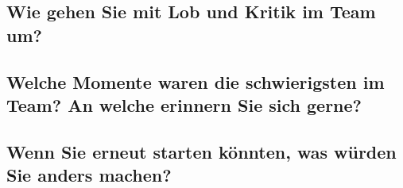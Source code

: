 \subsection*{Wie gehen Sie mit Lob und Kritik im Team um?}

\subsection*{Welche Momente waren die schwierigsten im Team? An welche erinnern Sie sich
gerne?}

\subsection*{Wenn Sie erneut starten könnten, was würden Sie anders machen?}

\begin{comment}
Nach unseren individuell erstellten Selbsteinsch"atzungen, folgen nun die Fremdeinsch"atzungen, welche f"ur
den Vergleich von Selbst- und Fremdbild unabdingbar sind.
Dazu hat jedes Teammitglied seine eigene Form der Bearbeitung gew"ahlt. Dies war einerseits der Selbsteinsch"atzungstest, andererseits wurden anhand von spezifisch beobachteten Situationen eine Teamrollenzuteilung
vorgenommen.
\subsection*{Pascal Horat}

Auch um meine Teamkameraden einzuschätzen habe ich mich des vorher beschriebenen Belbin-Tests bedient. Dies vor allem aus drei Gründen:
\begin{enumerate}
\item Durch die vorgegebene Form ergibt sich meiner Meinung nach eine neutralere Betrachtung der Teamitglieder, da meine Einschätzung nicht nur auf ein bis zwei spezifischen Vorfällen beruht.
\item Durch die vorgegebene Form mit den Aussagen werde ich durch das Verfahren geleitet und muss nicht selber etwas entwickeln.
\item Da für die Bestimmung der Selbst- sowie der Fremdeinschätzung derselbe Test verwendet wurde, können direkte Vergleiche zwischen den Teammitgliedern gemacht werden.
\end{enumerate}

Dies hat für Gerome folgende Resultate hervorgebracht:



Von meinen Teammitgliedern fiel es mir, ohne die Hilfe des Tests, schwieriger, Gerome eine passende Rolle zuzuteilen. Darum hätte ich eine ausgeglichenere Punkteverteilung bei der Auswertung erwartet. Die Rolle des Ausgleichers, bei welcher er am meisten Punkte sammelte, finde ich jedoch passend. Dass sie bei ihm aber so ausgeprägt zum Zuge kommt, hat mich eher überrascht.


\end{comment}
